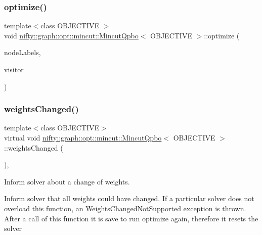 \subsubsection{\texorpdfstring{optimize()}{optimize()}}
{\footnotesize\ttfamily template$<$class O\+B\+J\+E\+C\+T\+I\+VE $>$ \\
void \hyperlink{classnifty_1_1graph_1_1opt_1_1mincut_1_1MincutQpbo}{nifty\+::graph\+::opt\+::mincut\+::\+Mincut\+Qpbo}$<$ O\+B\+J\+E\+C\+T\+I\+VE $>$\+::optimize (\begin{DoxyParamCaption}\item[{\hyperlink{classnifty_1_1graph_1_1opt_1_1mincut_1_1MincutQpbo_ac4034e26807b6dd2ec740c8716f89ad8}{Node\+Labels\+Type} \&}]{node\+Labels,  }\item[{\hyperlink{classnifty_1_1graph_1_1opt_1_1mincut_1_1MincutQpbo_a1233aed5d95f3549018cabfb2f5c51c3}{Visitor\+Base\+Type} $\ast$}]{visitor }\end{DoxyParamCaption})\hspace{0.3cm}{\ttfamily [virtual]}}

\mbox{\label{classnifty_1_1graph_1_1opt_1_1mincut_1_1MincutQpbo_acab46ec306e4b604eff21549a4366d39}} 
\subsubsection{\texorpdfstring{weights\+Changed()}{weightsChanged()}}
{\footnotesize\ttfamily template$<$class O\+B\+J\+E\+C\+T\+I\+VE$>$ \\
virtual void \hyperlink{classnifty_1_1graph_1_1opt_1_1mincut_1_1MincutQpbo}{nifty\+::graph\+::opt\+::mincut\+::\+Mincut\+Qpbo}$<$ O\+B\+J\+E\+C\+T\+I\+VE $>$\+::weights\+Changed (\begin{DoxyParamCaption}{ }\end{DoxyParamCaption})\hspace{0.3cm}{\ttfamily [inline]}, {\ttfamily [virtual]}}



Inform solver about a change of weights. 

Inform solver that all weights could have changed. If a particular solver does not overload this function, an Weights\+Changed\+Not\+Supported exception is thrown. After a call of this function it is save to run optimize again, therefore it resets the solver 

